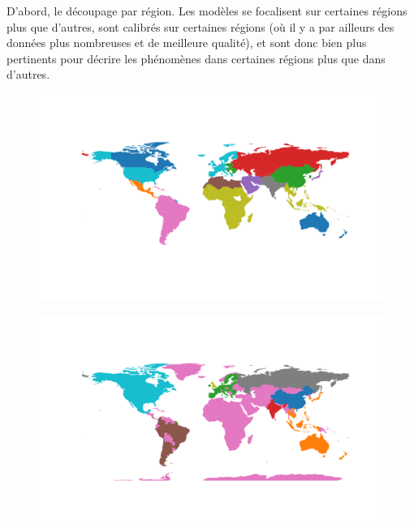 D'abord, le découpage par région. Les modèles se focalisent sur certaines régions plus que d'autres, sont calibrés sur certaines régions (où il y a par ailleurs des données plus nombreuses et de meilleure qualité), et sont donc bien plus pertinents pour décrire les phénomènes dans certaines régions plus que dans d'autres.  

\begin{figure}[htbp]
    \centering
    \begin{minipage}{0.45\textwidth}
        \centering
        \includegraphics[width=\linewidth]{results/carte_fund.png} %
        \label{fig:carte_fund}
    \end{minipage}%
    \hfill
    \begin{minipage}{0.45\textwidth}
        \centering
        \includegraphics[width=\linewidth]{results/carte_wiliam.png} %
        \label{fig:carte_WILIAM}
    \end{minipage}%

\end{figure}
